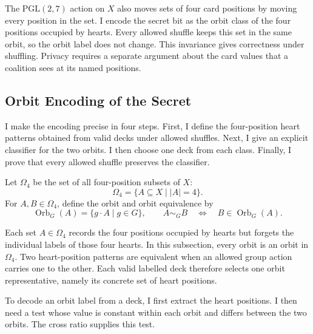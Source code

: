 \documentclass[runningheads]{llncs}
\newcommand{\PG}{\mathrm{PGL}(2,7)}
\begin{document}
The $\PG$ action on $X$ also moves sets of four card positions by moving every
position in the set. I encode the secret bit as the orbit class of the four
positions occupied by hearts. Every allowed shuffle keeps this set in the same
orbit, so the orbit label does not change. This invariance gives correctness
under shuffling. Privacy requires a separate argument about the card values
that a coalition sees at its named positions.

\subsection{Orbit Encoding of the Secret}

I make the encoding precise in four steps. First, I define the four-position
heart patterns obtained from valid decks under allowed shuffles. Next, I give
an explicit classifier for the two orbits. I then choose one deck from each
class. Finally, I prove that every allowed shuffle preserves the classifier.

\begin{definition}
Let $\Omega_4$ be the set of all four-position subsets of $X$: \[
\Omega_4=\{A\subseteq X\mid |A|=4\}. \] For $A,B\in\Omega_4$, define the orbit
and orbit equivalence by \[ \operatorname{Orb}_G(A)=\{g\mathbin{\cdot}A\mid
g\in G\}, \qquad A\sim_G B \quad\Longleftrightarrow\quad
B\in\operatorname{Orb}_G(A). \]
\end{definition}

Each set $A\in\Omega_4$ records the four positions occupied by hearts but
forgets the individual labels of those four hearts. In this subsection, every
orbit is an orbit in $\Omega_4$. Two heart-position patterns are equivalent
when an allowed group action carries one to the other. Each valid labelled
deck therefore selects one orbit representative, namely its concrete set of
heart positions.

To decode an orbit label from a deck, I first extract the heart positions. I
then need a test whose value is constant within each orbit and differs between
the two orbits. The cross ratio supplies this test.
\end{document}
